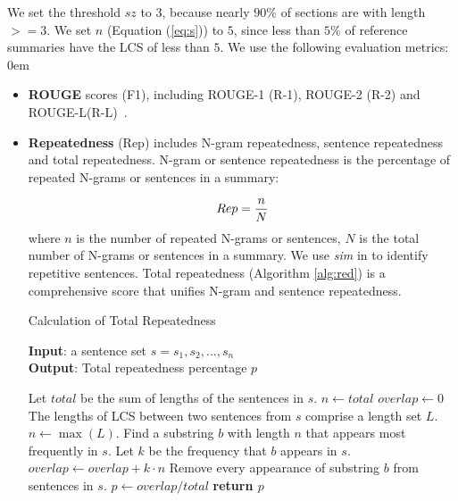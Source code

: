 We set the threshold $sz$ to $3$, 
because nearly $90\%$ 
of sections are with length$>=$3.
We set $n$ (Equation (\ref{eq:s})) to $5$,
since less than $5\%$ of reference summaries have
the LCS of less than $5$.
We use the following evaluation metrics:
\itemsep0em
\begin{itemize}

\item \textbf{ROUGE} scores (F1), including ROUGE-1 (R-1), ROUGE-2 (R-2) and
ROUGE-L(R-L)~\cite{rouge-a-package-for-automatic-evaluation-of-summaries}.

\item \textbf{Repeatedness} (Rep) includes N-gram repeatedness, sentence repeatedness
and total repeatedness. 
N-gram or sentence repeatedness is the percentage of repeated N-grams 
or sentences in a summary:

\begin{equation}
\small Rep = \frac{n}{N}
\end{equation}
where $n$ is the number of repeated N-grams or sentences, 
$N$ is the total number of N-grams or sentences in a summary.
We use \textit{sim} in  to
identify repetitive sentences.
Total repeatedness (Algorithm \ref{alg:red}) is a comprehensive score that unifies N-gram and sentence repeatedness.

\begin{algorithm}[th]
\caption{Calculation of Total Repeatedness}
\small
\label{alg:red}
\textbf{Input}: a sentence set $s = {s_{1}, s_{2},...,s_{n}}$\\
\textbf{Output}: Total repeatedness percentage $p$
\begin{algorithmic}[1] %
\STATE Let $total$ be the sum of lengths of the sentences in $s$.
\STATE $n \leftarrow total$
\STATE $overlap \leftarrow 0$
\STATE The lengths of LCS between two sentences from $s$ comprise a length set $L$.
\STATE $n \leftarrow \max(L)$.
\STATE Find a substring $b$ with length $n$ that appears most frequently in $s$.
\STATE Let $k$ be the frequency that $b$ appears in $s$.
\STATE $overlap \leftarrow overlap + k\cdot n$
\STATE Remove every appearance of substring $b$ from sentences in $s$.
\ENDWHILE
\STATE $p \leftarrow overlap/total$
\STATE \textbf{return $p$} 
\end{algorithmic}
\end{algorithm}


\end{itemize}
